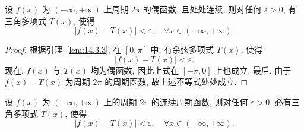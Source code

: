 \begin{lemma}\label{lem:14.3.4}
设 $f(x)$ 为 $(-\infty,+\infty)$ 上周期 $2\pi$ 的偶函数, 且处处连续, 则对任何 $\varepsilon>0$, 有三角多项式 $T(x)$, 使得
\[
  |f(x)-T(x)|<\varepsilon,\quad\forall x\in(-\infty,+\infty).
\]
\end{lemma}

\begin{proof}
根据引理~\ref{lem:14.3.3}, 在 $[0,\pi]$ 中, 有余弦多项式 $T(x)$, 使得
\[
  |f(x)-T(x)|<\varepsilon.
\]
现在, $f(x)$ 与 $T(x)$ 均为偶函数, 因此上式在 $[-\pi,0]$ 上也成立. 最后, 由于 $f(x)-T(x)$ 为周期 $2\pi$ 的周期函数, 故上述不等式处处成立.
\end{proof}

\begin{theorem}[Weierstrass]\label{thm:14.3.8}
设 $f(x)$ 为 $(-\infty,+\infty)$ 上的周期 $2\pi$ 的连续周期函数, 则对任何 $\varepsilon>0$, 必有三角多项式 $T(x)$, 使得
\[
  |f(x)-T(x)|<\varepsilon,\quad\forall x\in(-\infty,+\infty).
\]
\end{theorem}

